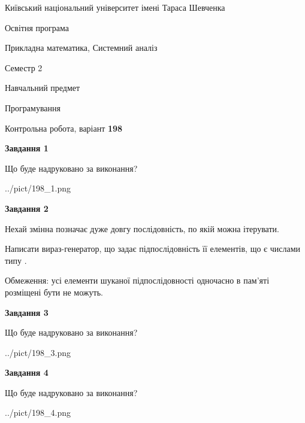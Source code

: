 \documentclass[12pt, ukrainian]{article}
\begin{document}
{{\begin {small}\par
{ \center  Київський національний університет імені Тараса Шевченка \par}
{\parbox {5 cm}{Освітня програма \hfill}{\parbox {8 cm}{Прикладна математика, Системний аналіз \hfill}}\parbox {5 cm}{\hfill Семестр 2}}\par
{\parbox {5 cm} {Навчальний предмет \hfill}\parbox {7 cm}{Програмування \hfill}\parbox {6cm}{\hfill}\par}\vspace{-7pt} \end{small}}{\center Контрольна робота, варіант  \No \textbf
{ 198 }\par}}
{
\begin {large}
{\begin {center}\textbf{Завдання 1}\end {center}}\par
Що буде надруковано за виконання?\par\par
\begin{center}
	{../pict/198_1.png}
\end{center}
\newpage

{\begin {center}\textbf{Завдання 2}\end {center}}\par
Нехай змінна  позначає дуже довгу послідовність, по якій можна ітерувати.

Написати вираз-генератор, що задає підпослідовність її елементів, що є числами типу .

Обмеження: усі елементи шуканої підпослідовності одночасно в пам'яті розміщені бути не можуть.\par
\newpage

{\begin {center}\textbf{Завдання 3}\end {center}}\par
Що буде надруковано за виконання?\par
\begin{center}
	{../pict/198_3.png}
\end{center}
\newpage

{\begin {center}\textbf{Завдання 4}\end {center}}\par
Що буде надруковано за виконання?\par
\begin{center}
	{../pict/198_4.png}
\end{center}
\newpage


\end{large}}
\end{document}
